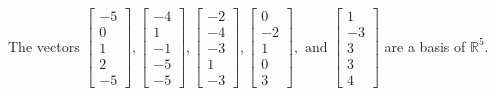 \begin{exercise}
\begin{exerciseStatement}
  \end{exerciseStatement}
  \begin{exerciseAnswer}
   The vectors \(\left[\begin{array}{r}
-5 \\
0 \\
1 \\
2 \\
-5
\end{array}\right] , \left[\begin{array}{r}
-4 \\
1 \\
-1 \\
-5 \\
-5
\end{array}\right] , \left[\begin{array}{r}
-2 \\
-4 \\
-3 \\
1 \\
-3
\end{array}\right] , \left[\begin{array}{r}
0 \\
-2 \\
1 \\
0 \\
3
\end{array}\right] , \text{ and } \left[\begin{array}{r}
1 \\
-3 \\
3 \\
3 \\
4
\end{array}\right]\) 
  	 are  a basis of \(\mathbb{R}^5\).
  


  \end{exerciseAnswer}
\end{exercise}